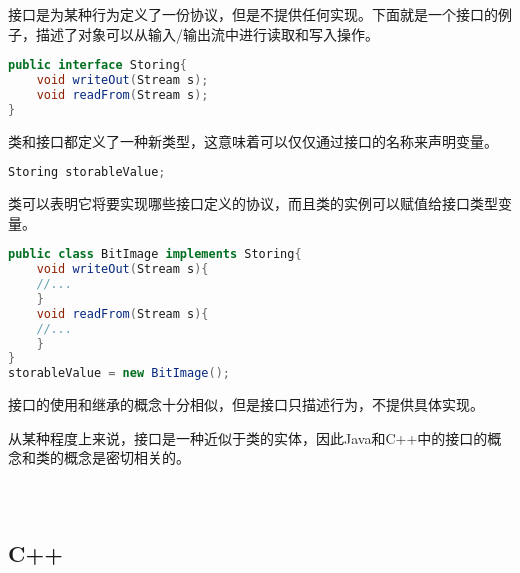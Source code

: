 接口是为某种行为定义了一份协议，但是不提供任何实现。下面就是一个接口的例子，描述了对象可以从输入/输出流中进行读取和写入操作。



\begin{lstlisting}[language=Java]
public interface Storing{
	void writeOut(Stream s);
	void readFrom(Stream s);
}
\end{lstlisting}

类和接口都定义了一种新类型，这意味着可以仅仅通过接口的名称来声明变量。


\begin{lstlisting}[language=Java]
Storing storableValue;
\end{lstlisting}

类可以表明它将要实现哪些接口定义的协议，而且类的实例可以赋值给接口类型变量。


\begin{lstlisting}[language=Java]
public class BitImage implements Storing{
	void writeOut(Stream s){
	//...
	}
	void readFrom(Stream s){
	//...
	}
}
storableValue = new BitImage();
\end{lstlisting}

接口的使用和继承的概念十分相似，但是接口只描述行为，不提供具体实现。

从某种程度上来说，接口是一种近似于类的实体，因此Java和C++中的接口的概念和类的概念是密切相关的。


\begin{lstlisting}[language=Java]

\end{lstlisting}





\begin{lstlisting}[language=Java]

\end{lstlisting}





\begin{lstlisting}[language=Java]

\end{lstlisting}




\subsection{C++}





